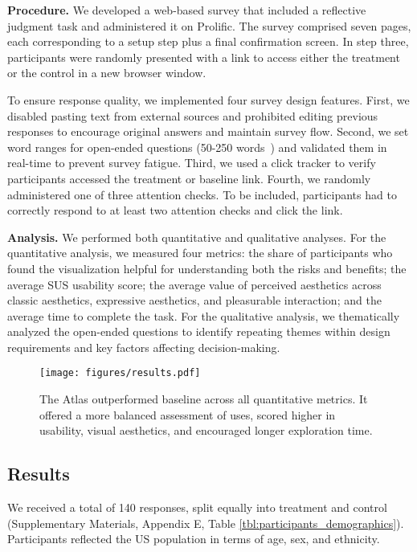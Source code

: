 \smallskip
\noindent\textbf{Procedure.}
We developed a web-based survey that included a reflective judgment task and administered it on Prolific. The survey comprised seven pages, each corresponding to a setup step plus a final confirmation screen. In step three, participants were randomly presented with a link to access either the treatment or the control in a new browser window.

To ensure response quality, we implemented four survey design features. First, we disabled pasting text from external sources and prohibited editing previous responses to encourage original answers and maintain survey flow. Second, we set word ranges for open-ended questions (50-250 words~\cite{liang2024s}) and validated them in real-time to prevent survey fatigue. Third, we used a click tracker to verify participants accessed the treatment or baseline link. Fourth, we randomly administered one of three attention checks. To be included, participants had to correctly respond to at least two attention checks and click the link.

\smallskip
\noindent\textbf{Analysis.} We performed both quantitative and qualitative analyses. 
For the quantitative analysis, we measured four metrics: the share of participants who found the visualization helpful for understanding both the risks and benefits; the average SUS usability score; the average value of perceived aesthetics across classic aesthetics, expressive aesthetics, and pleasurable interaction; and the average time to complete the task. For the qualitative analysis, we thematically analyzed the open-ended questions \cite{miles1994qualitative} to identify repeating themes within design requirements and key factors affecting decision-making.

\begin{figure}[t!]
  \centering
  \texttt{[image: figures/results.pdf]}
  \caption{The Atlas outperformed baseline across all quantitative metrics. It offered a more balanced assessment of uses, scored higher in usability, visual aesthetics, and encouraged longer exploration time.}
  \label{fig:results}
\end{figure}

\subsection{Results}
We received a total of 140 responses, split equally into treatment and control (Supplementary Materials, Appendix E, Table \ref{tbl:participants_demographics}). Participants reflected the US population in terms of age, sex, and ethnicity.


